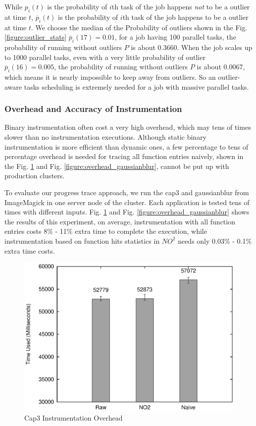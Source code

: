 While $p_i(t)$ is the probability of $i$th task of the job happens \emph{not} to be a outlier at time $t$, $\overline{p}_i(t)$ is the probability of $i$th task of the job happens to be a outlier at time $t$. We choose the median of the Probability of outliers shown in the Fig. \ref{figure:outlier_stats} $\overline{p}_i(17) = 0.01$, for a job having 100 parallel tasks, the probability of running without outliers $P$ is about 0.3660. When the job scales up to 1000 parallel tasks, even with a very little probability of outlier $\overline{p}_i(16) = 0.005$, the probability of running without outliers $P$ is about 0.0067, which means it is nearly impossible to keep away from outliers. So an outlier-aware tasks scheduling is extremely needed for a job with massive parallel tasks.

\subsubsection{Overhead and Accuracy of Instrumentation}

Binary instrumentation often cost a very high overhead, which may tens of times slower than no instrumentation executions. Although static binary instrumentation is more efficient than dynamic ones, a few percentage to tens of percentage overhead is needed for tracing all function entries naively, shown in the Fig. \ref{figure:overhead_cap3} and Fig. \ref{figure:overhead_gaussianblur}, cannot be put up with production clusters.

To evaluate our progress trace approach, we run the cap3 and gaussianblur from ImageMagick in one server node of the cluster. Each application is tested tens of times with different inputs. Fig. \ref{figure:overhead_cap3} and Fig. \ref{figure:overhead_gaussianblur} shows the results of this experiment, on average, instrumentation with all function entries costs 8\% - 11\% extra time to complete the execution, while instrumentation based on function hits statistics in $NO^2$ needs only 0.03\% - 0.1\% extra time costs.

\begin{figure}
\centering
  \includegraphics[width=0.9\columnwidth]{figures/overhead_cap3.eps}
\caption{Cap3 Instrumentation Overhead}
\label{figure:overhead_cap3}
\end{figure}

